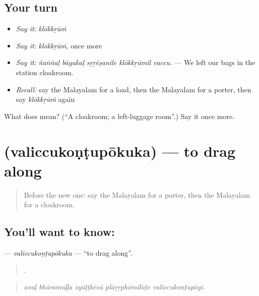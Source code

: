 \subsection*{Your turn}
\begin{itemize}
\raggedright
  \item \emph{Say it:} \emph{klōkkṟūṁ}
  \item \emph{Say it:} \emph{klōkkṟūṁ}, once more
  \item \emph{Say it:} \emph{ñaṅṅaḷ bāgukaḷ sṟṟēṣanile klōkkṟūmil vaccu.} — We left our bags in the station cloakroom.
  \item \emph{Recall:} say the Malayalam for a load, then the Malayalam for a porter, then say \emph{klōkkṟūṁ} again
\end{itemize}

\begin{tcolorbox}[breakable,colback=teal!4,colframe=teal!35!black,title={Before you move on}]
What does  mean? (\textquotedblleft{}A cloakroom; a left-luggage room\textquotedblright{}.) Say it once more.
\end{tcolorbox}
\section[\texorpdfstring{\ml{വലിച്ചുകൊണ്ടുപോകുക} (valiccukoṇṭupōkuka)}{വലിച്ചുകൊണ്ടുപോകുക (valiccukoṇṭupōkuka)}]{ (valiccukoṇṭupōkuka) — to drag along}

\label{lesson:ML-C466-valiccukontupokuka}



\begin{quote}
Before the new one: say the Malayalam for a porter, then the Malayalam for a cloakroom.
\end{quote}

\subsection*{You'll want to know: }
\textbf{} — \emph{valiccukoṇṭupōkuka} — \textquotedblleft{}to drag along\textquotedblright{}.

\begin{quote}
    .
\end{quote}

\begin{quote}
\emph{avaḷ bhāramuḷḷa syūṭṭkēsŭ plāṟṟphōmilūṭe valiccukoṇṭupōyi.}
\end{quote}

